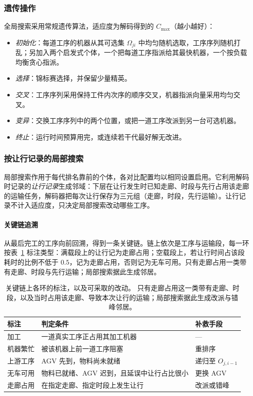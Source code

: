 \documentclass[manuscript,screen,review]{acmart}
\newcommand{\LSThr}{0.5}                  %
\begin{document}
\subsubsection{遗传操作}

全局搜索采用常规遗传算法，适应度为解码得到的 $C_{\max}$（越小越好）：
\begin{itemize}[leftmargin=*,topsep=2pt,itemsep=1pt]
  \item \emph{初始化}：每道工序的机器从其可选集 $\Omega_{ji}$ 中均匀随机选取，工序序列随机打乱；另加入两个启发式个体，一个把每道工序指派给其最快机器，一个按负载均衡贪心指派。
  \item \emph{选择}：锦标赛选择，并保留少量精英。
  \item \emph{交叉}：工序序列采用保持工件内次序的顺序交叉，机器指派向量采用均匀交叉。
  \item \emph{变异}：交换工序序列中的两个位置，或把一道工序改派到另一台可选机器。
  \item \emph{终止}：运行时间预算用完，或连续若干代最好解无改进。
\end{itemize}

\subsubsection{按让行记录的局部搜索}
\label{sec:ls}

局部搜索作用于每代排名靠前的个体，各对比配置均以相同设置启用。它利用解码时记录的\emph{让行记录}生成邻域：下层在让行发生时已知走廊、时段与先行占用该走廊的运输任务，解码器把每次让行保存为三元组（走廊，时段，先行运输）。让行记录不计入适应度，只决定局部搜索改动哪些工序。

\paragraph{关键链追溯}
从最后完工的工序向前回溯，得到一条关键链。链上依次是工序与运输段，每一环按表~\ref{tab:attrib} 标注类型：满载段上的让行记为走廊占用；空载段上，若让行时间占该段耗时的比例不低于 $\LSThr$，记为走廊占用，否则记为无车可用。只有走廊占用一类带有走廊、时段与先行运输；局部搜索据此生成邻居。

\begin{table}[t]
  \caption{关键链上各环的标注，以及可采取的改动。
  只有走廊占用这一类带有走廊、时段，以及当时占用该走廊、导致本次让行的运输；局部搜索据此生成改派与错峰邻居。}
\label{tab:attrib}
\footnotesize
\begin{tabular}{@{}llp{2.55cm}@{}}
\toprule
标注 & 判定条件 & 补救手段 \\
\midrule
加工 & 一道真实工序正占用其加工机器 & --- \\
机器繁忙 & 被该机器上前一道工序阻塞
  & 重排序 \\
上游工序 & AGV 先到，物料尚未就绪 & 递归至 $O_{j,i-1}$ \\
无车可用 & 物料已就绪、AGV 迟到，且延误中让行占比很小 & 更换 AGV \\
走廊占用 & 在指定走廊、指定时段上发生让行 & 改派或错峰 \\
\bottomrule
\end{tabular}
\end{table}
\end{document}
